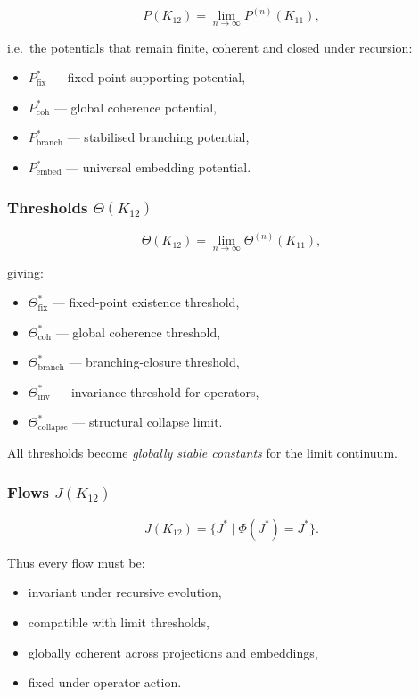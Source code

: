 \[
P(K_{12}) = \lim_{n\to\infty} P^{(n)}(K_{11}),
\]

i.e.\ the potentials that remain finite, coherent and closed under recursion:
\begin{itemize}
    \item $P_{\mathrm{fix}}^*$ — fixed-point-supporting potential,
    \item $P_{\mathrm{coh}}^*$ — global coherence potential,
    \item $P_{\mathrm{branch}}^*$ — stabilised branching potential,
    \item $P_{\mathrm{embed}}^*$ — universal embedding potential.
\end{itemize}

\subsubsection{Thresholds $\Theta(K_{12})$}

\[
\Theta(K_{12}) =
\lim_{n\to\infty} \Theta^{(n)}(K_{11}),
\]

giving:
\begin{itemize}
    \item $\Theta^*_{\mathrm{fix}}$ — fixed-point existence threshold,
    \item $\Theta^*_{\mathrm{coh}}$ — global coherence threshold,
    \item $\Theta^*_{\mathrm{branch}}$ — branching-closure threshold,
    \item $\Theta^*_{\mathrm{inv}}$ — invariance-threshold for operators,
    \item $\Theta^*_{\mathrm{collapse}}$ — structural collapse limit.
\end{itemize}

All thresholds become \emph{globally stable constants} for the limit continuum.

\subsubsection{Flows $J(K_{12})$}

\[
J(K_{12}) = \{J^*\mid \Phi(J^*)=J^*\}.
\]

Thus every flow must be:
\begin{itemize}
    \item invariant under recursive evolution,
    \item compatible with limit thresholds,
    \item globally coherent across projections and embeddings,
    \item fixed under operator action.
\end{itemize}

